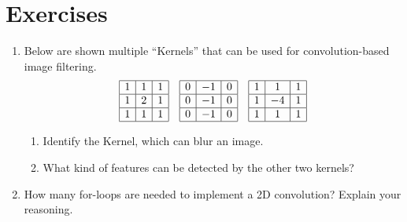 \section*{Exercises}\small
\begin{enumerate}
\item Below are shown multiple ``Kernels'' that can be used for convolution-based image filtering. 
\begin{equation}
\nonumber
\begin{array}{|c|c|c|}
\hline
1 & 1 & 1\\
\hline
1 & 2 & 1\\
\hline
1 & 1 & 1\\
\hline
\end{array}
\quad
\begin{array}{|c|c|c|}
\hline
0 & -1 & 0\\
\hline
0 & -1 & 0\\
\hline
0 & -1 & 0\\
\hline
\end{array}
\quad
\begin{array}{|c|c|c|}
\hline
1 & 1 & 1\\
\hline
1 & -4 & 1\\
\hline
1 & 1 & 1\\
\hline
\end{array}
\end{equation}
\begin{enumerate}
\item Identify the Kernel, which can blur an image.
\item What kind of features can be detected by the other two kernels?
\end{enumerate}
\item How many for-loops are needed to implement a 2D convolution? Explain your reasoning.  
\end{enumerate} \normalsize
